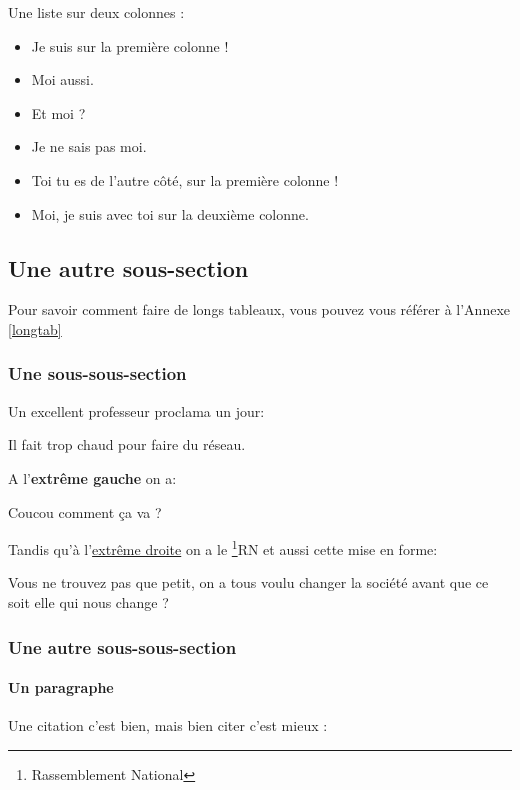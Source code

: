 Une liste sur deux colonnes :
\begin{itemize}[twocol]
    \item Je suis sur la première colonne !
    \item Moi aussi.
    \item Et moi ?
    \item Je ne sais pas moi.
    \item Toi tu es de l'autre côté, sur la première colonne !
    \item Moi, je suis avec toi sur la deuxième colonne.
\end{itemize}


\subsection{Une autre sous-section}
Pour savoir comment faire de longs tableaux, vous pouvez vous référer à l'Annexe \ref{longtab}
\subsubsection{Une sous-sous-section}
Un excellent professeur proclama un jour:
\begin{center}
Il fait trop chaud pour faire du réseau.
\end{center}

A l'\textbf{extrême gauche} on a:
\begin{flushleft}
    Coucou comment ça va ?
\end{flushleft}

Tandis qu'à l'\underline{extrême droite} on a le \href{https://rassemblementnational.fr/}{\footnote{Rassemblement National}{RN}} et aussi cette mise en forme:

\begin{flushright}
    Vous ne trouvez pas que petit, on a tous voulu changer la société avant que ce soit elle qui nous change ?
\end{flushright}

\subsubsection{Une autre sous-sous-section}
\paragraph{Un paragraphe}
Une citation c'est bien, mais bien citer c'est mieux :

